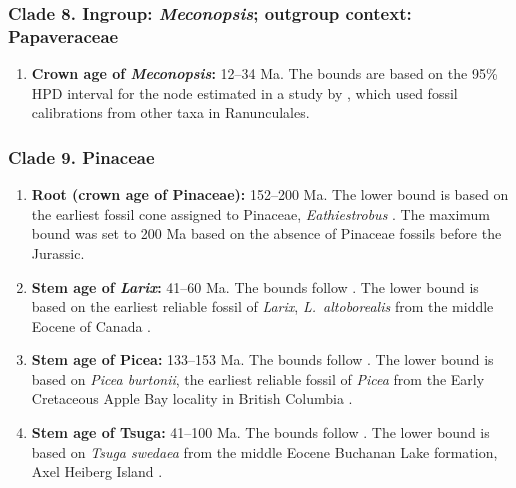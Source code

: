\documentclass[10pt]{article}
\begin{document}
\subsubsection*{Clade 8. Ingroup: \textit{Meconopsis}; outgroup
  context: Papaveraceae}

\begin{enumerate}
\item \textbf{Crown age of \textit{Meconopsis}:} 12--34 Ma. The bounds
  are based on the 95\% HPD interval for the node estimated in a study
  by \citet{Xiao2013}, which used fossil calibrations from other taxa
  in Ranunculales.
\end{enumerate}

\subsubsection*{Clade 9. Pinaceae}

\begin{enumerate}
\item \textbf{Root (crown age of Pinaceae):} 152--200 Ma. The lower
  bound is based on the earliest fossil cone assigned to Pinaceae,
  \textit{Eathiestrobus} \citep{Rothwell2012}. The maximum bound was
  set to 200 Ma based on the absence of Pinaceae fossils before the
  Jurassic.%

\item \textbf{Stem age of \textit{Larix}:} 41--60 Ma. The bounds
  follow \citet{Leslie2012}. The lower bound is based on the
  earliest reliable fossil of \textit{Larix}, \textit{L.~altoborealis}
  from the middle Eocene of Canada \citep{LePage1991}.

\item \textbf{Stem age of Picea:} 133--153 Ma. The bounds follow
  \citet{Leslie2012}. The lower bound is based on \textit{Picea
    burtonii}, the earliest reliable fossil of \textit{Picea} from the
  Early Cretaceous Apple Bay locality in British Columbia
  \citep{Klymiuk2012}.

\item \textbf{Stem age of Tsuga:} 41--100 Ma. The bounds follow
  \citet{Leslie2012}. The lower bound is based on \textit{Tsuga
    swedaea} from the middle Eocene Buchanan Lake formation, Axel
  Heiberg Island \citep{Lepage2003}.

\end{enumerate}
\end{document}
